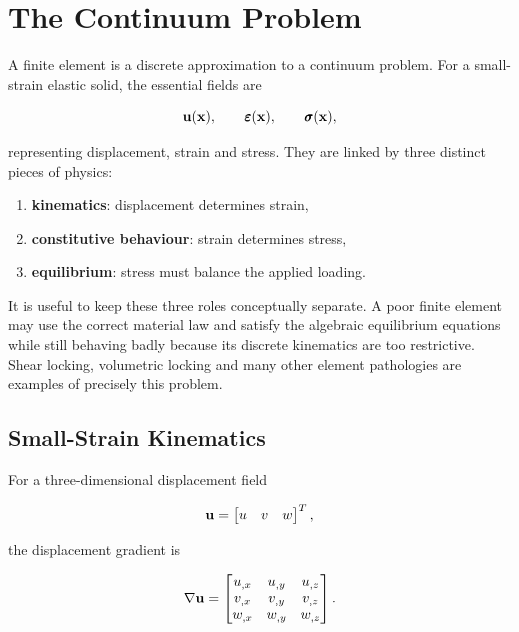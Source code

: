 \section{The Continuum Problem}

A finite element is a discrete approximation to a continuum problem. For a
small-strain elastic solid, the essential fields are

\begin{equation}
    \mathbf{u}(\mathbf{x}),\qquad
    \pmb{\varepsilon}(\mathbf{x}),\qquad
    \pmb{\sigma}(\mathbf{x}),
\end{equation}

representing displacement, strain and stress. They are linked by three distinct
pieces of physics:

\begin{enumerate}
    \item \textbf{kinematics}: displacement determines strain,
    \item \textbf{constitutive behaviour}: strain determines stress,
    \item \textbf{equilibrium}: stress must balance the applied loading.
\end{enumerate}

It is useful to keep these three roles conceptually separate. A poor finite
element may use the correct material law and satisfy the algebraic equilibrium
equations while still behaving badly because its discrete kinematics are too
restrictive. Shear locking, volumetric locking and many other element pathologies
are examples of precisely this problem.

\subsection{Small-Strain Kinematics}

For a three-dimensional displacement field

\begin{equation}
    \mathbf{u}=\begin{bmatrix}u&v&w\end{bmatrix}^T,
\end{equation}

the displacement gradient is

\begin{equation}
    \nabla\mathbf{u}
    =
    \begin{bmatrix}
        u_{,x} & u_{,y} & u_{,z}\\
        v_{,x} & v_{,y} & v_{,z}\\
        w_{,x} & w_{,y} & w_{,z}
    \end{bmatrix}.
\end{equation}

